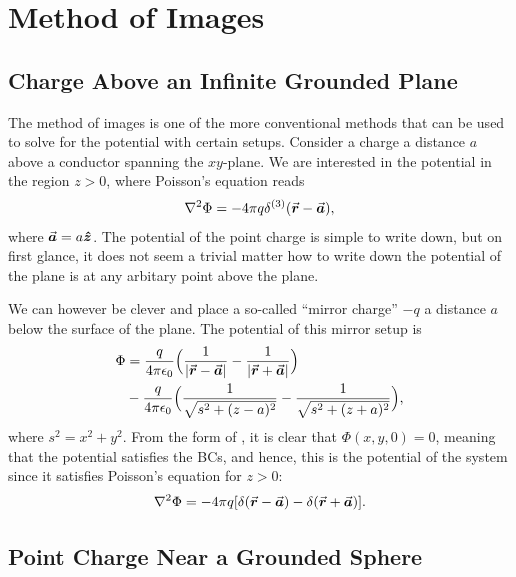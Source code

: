 \chapter{Method of Images}

\section{Charge Above an Infinite Grounded Plane}

The method of images is one of the more conventional methods that can be used to solve for the potential with certain setups.
Consider a charge a distance $a$ above a conductor spanning the $xy$-plane.
We are interested in the potential in the region $z > 0$, where Poisson's equation reads
\begin{eqnarray}
    \laplacian \Phi = -4 \pi q \delta^{(3)}(\va*{r} - \va*{a})
,\end{eqnarray}
where $\va*{a} = a\vu*{z}$.
The potential of the point charge is simple to write down, but on first glance, it does not seem a trivial matter how to write down the potential of the plane is at any arbitary point above the plane.

We can however be clever and place a so-called ``mirror charge'' $-q$ a distance $a$ below the surface of the plane.
The potential of this mirror setup is
\begin{align}
    \label{eq:generic-plane-pot}
    \Phi &= \frac{q}{4 \pi \epsilon_0} \Big( \frac{1}{|\va*{r} - \va*{a}|} - \frac{1}{|\va*{r} + \va*{a}|}\Big) \\
    \label{eq:specific-plane-pot}
         &- \frac{q}{4 \pi \epsilon_0} \Big( \frac{1}{\sqrt{s^2 + (z - a)^2}} - \frac{1}{\sqrt{s^2 + (z + a)^2}} \Big)
,\end{align}
where $s^2 = x^2 + y^2$.
From the form of , it is clear that $\Phi(x,y,0) = 0$, meaning that the potential satisfies the BCs, and hence, this is the potential of the system since it satisfies Poisson's equation for $z > 0$:
\begin{eqnarray}
    \laplacian \Phi = -4 \pi q [ \delta(\va*{r} - \va*{a}) - \delta(\va*{r} + \va*{a}) ]
.\end{eqnarray}

\section{Point Charge Near a Grounded Sphere}

